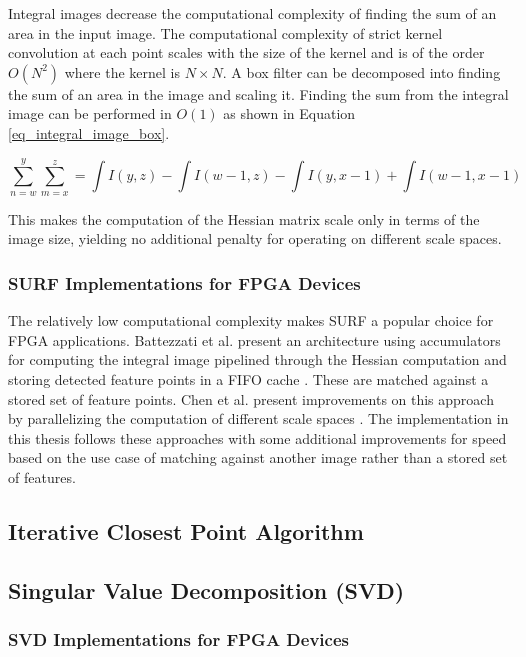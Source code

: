 \documentclass{article}
\begin{document}
Integral images decrease the computational complexity of finding the sum of an area in the input image. The computational complexity of strict kernel convolution at each point scales with the size of the kernel and is of the order $O(N^2)$ where the kernel is $N \times N$. A box filter can be decomposed into finding the sum of an area in the image and scaling it. Finding the sum from the integral image can be performed in $O(1)$ as shown in Equation \ref{eq_integral_image_box}. 

\begin{equation}
\sum\limits_{n=w}^y \sum\limits_{m=x}^z = \int I(y,z) - \int I(w-1,z) - \int I(y,x-1) + \int I(w-1, x-1)
\label{eq_integral_image_box}
\end{equation}

This makes the computation of the Hessian matrix scale only in terms of the image size, yielding no additional penalty for operating on different scale spaces.

\subsubsection{SURF Implementations for FPGA Devices}

The relatively low computational complexity makes SURF a popular choice for FPGA applications. Battezzati et al. present an architecture using accumulators for computing the integral image pipelined through the Hessian computation and storing detected feature points in a FIFO cache \cite{battezzati_surf_2012}. These are matched against a stored set of feature points. Chen et al. present improvements on this approach by parallelizing the computation of different scale spaces \cite{chen_fpga-based_2016}. The implementation in this thesis follows these approaches with some additional improvements for speed based on the use case of matching against another image rather than a stored set of features.

\subsection{Iterative Closest Point Algorithm}

\subsection{Singular Value Decomposition (SVD)}

\subsubsection{SVD Implementations for FPGA Devices}
\end{document}
